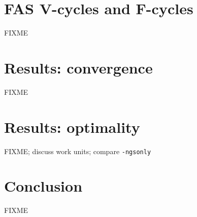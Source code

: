 \documentclass[letterpaper,final,12pt,reqno]{amsart}
\begin{document}
\section{FAS V-cycles and F-cycles}

FIXME

\section{Results: convergence}

FIXME

\section{Results: optimality}

FIXME; discuss work units; compare \texttt{-ngsonly}

\section{Conclusion}

FIXME


\small

\bigskip


\end{document}
